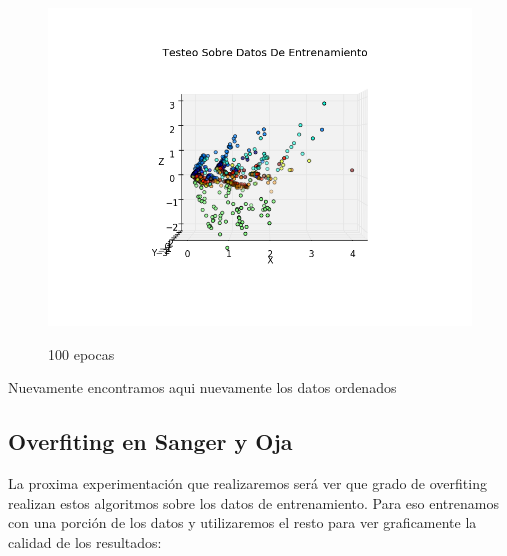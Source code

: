 \begin{figure}[h!]
	\centering
	\includegraphics[width=.6\linewidth]{convergencia_sanger/4.png}
  \label{fig:test1}
  \centering
  \caption{100 epocas}
\end{figure}

Nuevamente encontramos aqui nuevamente los datos ordenados 


\subsection{Overfiting en Sanger y Oja}

La proxima experimentación que realizaremos será ver que grado de overfiting realizan estos algoritmos sobre los datos de entrenamiento. Para eso entrenamos con una porción de los datos y utilizaremos el resto para ver graficamente la calidad de los resultados:

